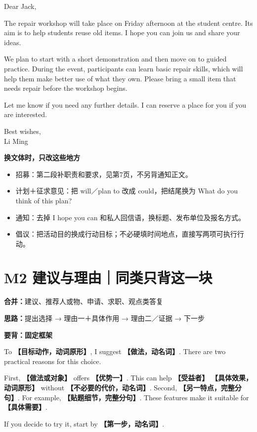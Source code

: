 \documentclass[11pt,a4paper,fontset=macnew]{ctexart}
\newenvironment{english}{\begingroup\fontsize{11}{15}\selectfont\setlength{\parskip}{4pt}}{\par\endgroup}
\newenvironment{example}{\begingroup\fontsize{10.5}{14}\selectfont\setlength{\parskip}{4pt}}{\par\endgroup}
\begin{document}
\begin{example}
Dear Jack,\par
The repair workshop will take place on Friday afternoon at the student centre. Its aim is to help students reuse old items. I hope you can join us and share your ideas.

We plan to start with a short demonstration and then move on to guided practice. During the event, participants can learn basic repair skills, which will help them make better use of what they own. Please bring a small item that needs repair before the workshop begins.

Let me know if you need any further details. I can reserve a place for you if you are interested.

Best wishes,\\Li Ming\par
\end{example}
\par\vspace{5pt}\noindent\textbf{换文体时，只改这些地方}\par\nopagebreak
{\small\begin{itemize}
\item 招募：第二段补职责和要求，见第7页，不另背通知正文。
\item 计划＋征求意见：把 will／plan to 改成 could，把结尾换为 What do you think of this plan?
\item 通知：去掉 I hope you can 和私人回信语，换标题、发布单位及报名方式。
\item 倡议：把活动目的换成行动目标；不必硬填时间地点，直接写两项可执行行动。
\end{itemize}}
\clearpage\section*{M2 建议与理由｜同类只背这一块}
{\small\textbf{合并：}建议、推荐人或物、申请、求职、观点类答复\par\textbf{思路：}提出选择 → 理由一＋具体作用 → 理由二／证据 → 下一步}\par
\par\vspace{5pt}\noindent\textbf{要背：固定框架}\par\nopagebreak
\begin{english}
To \textbf{【目标动作，动词原形】}, I suggest \textbf{【做法，动名词】}. There are two practical reasons for this choice.

First, \textbf{【做法或对象】} offers \textbf{【优势一】}. This can help \textbf{【受益者】} \textbf{【具体效果，动词原形】} without \textbf{【不必要的代价，动名词】}. Second, \textbf{【另一特点，完整分句】}. For example, \textbf{【贴题细节，完整分句】}. These features make it suitable for \textbf{【具体需要】}.

If you decide to try it, start by \textbf{【第一步，动名词】}.

\end{english}
\end{document}
